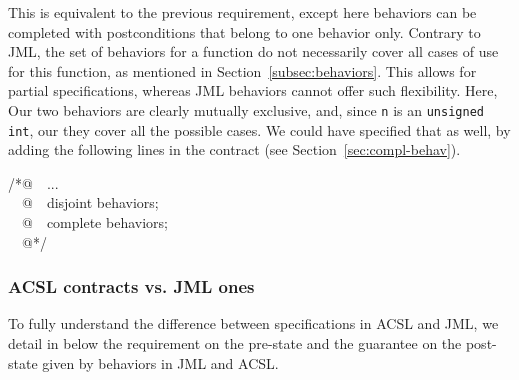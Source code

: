 This is equivalent to the previous requirement, except here behaviors
can be completed with postconditions that belong to one behavior only.
Contrary to JML, the set of behaviors for a function do not
necessarily cover all cases of use for this function, as mentioned in
Section~\ref{subsec:behaviors}. This allows for partial
specifications, whereas JML behaviors cannot offer such
flexibility. Here, Our two behaviors are clearly mutually exclusive,
and, since \texttt{n} is an \texttt{unsigned int}, our
they cover all the possible cases. We could have specified that as well, by
adding the following lines in the contract (see
Section~\ref{sec:compl-behav}).
\begin{flushleft}\ttfamily
/*@~~...\\
~~@~~disjoint behaviors;\\
~~@~~complete behaviors;\\
~~@*/
\end{flushleft}

\subsubsection*{ACSL contracts vs. JML ones}

To fully understand the difference between specifications in ACSL and
JML, we detail in below the requirement on the pre-state and
the guarantee on the post-state given by behaviors in JML and ACSL.

